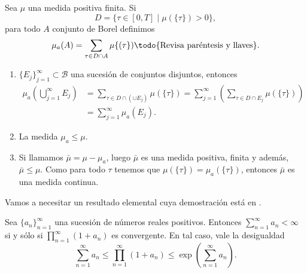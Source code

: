 \begin{defi}\label{mu_a}
	Sea $\mu$ una medida positiva finita.  
Si $$D=\{\tau\in[0,T] \mid \mu(\{\tau\})> 0\},$$ para todo $A$ conjunto de Borel definimos
$$\mu_a(A)=\sum_{\tau\in D\cap A}\mu\{(\tau\})\textrm{\todo{Revisa paréntesis y llaves}}.$$
\end{defi}




\begin{obs} \vphantom{a}
\begin{enumerate}
\item {} $\{E_j\}_{j=1}^\infty\subset \mathscr{B}$  una sucesión de conjuntos  disjuntos, entonces
\begin{equation*}
\begin{split}
	\mu_a \left( \bigcup_{j=1}^{\infty}E_j\right)& = \sum_{\tau\in D\cap \left( \cup E_j\right)}\mu(\{\tau\})
   =\sum_{j=1}^{\infty}\left( \sum_{\tau\in D\cap E_j}\mu(\{\tau\}) \right) \\ &=\sum_{j=1}^{\infty}\mu_a(E_j).
\end{split}
\end{equation*}
	

\item La medida $\mu_a\leq\mu$.

\item  Si llamamos $\bar{\mu}=\mu-\mu_a$\index[Simbolo]{$\bar{\mu}$}, luego $\bar{\mu}$ es una medida positiva,  finita y además, $\bar{\mu}\leq \mu$. Como para todo $\tau$ tenemos que $\mu(\{\tau\})=\mu_a(\{\tau\})$, entonces $\bar{\mu}$ es una medida continua.
\end{enumerate}
\end{obs}

Vamos a necesitar un resultado elemental cuya demostración está en \cite[Teorema 8.1.1]{limits}.
\begin{thm}\label{limits}
	Sea $\{a_n\}_{n=1}^\infty$ una sucesión de números reales positivos. Entonces $\displaystyle\sum_{n=1}^{\infty}a_n<\infty$ si y sólo si $\displaystyle\prod_{n=1}^\infty(1+a_n)$ es convergente.  En tal caso, vale la desigualdad
	\begin{equation*}
	\sum_{n=1}^{\infty}a_n\leq \prod_{n=1}^\infty(1+a_n) \leq \exp\left(\sum_{n=1}^{\infty}a_n \right). 
	\end{equation*}
\end{thm}
 

